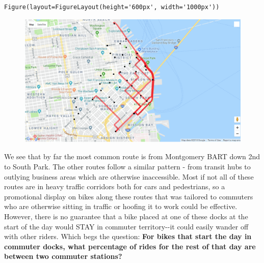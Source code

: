 \documentclass[11pt]{article}
\makeatletter
\def\maxwidth{\ifdim\Gin@nat@width>\linewidth\linewidth
    \else\Gin@nat@width\fi}
\let\Oldincludegraphics\includegraphics
\renewcommand{\includegraphics}[1]{\Oldincludegraphics[width=.8\maxwidth]{#1}}
\makeatother
\begin{document}
    
    \begin{verbatim}
Figure(layout=FigureLayout(height='600px', width='1000px'))
    \end{verbatim}

    
    \begin{figure}[htbp]
\centering
\includegraphics{imgs/commute_routes.PNG?raw=true}
\caption{}
\end{figure}

    We see that by far the most common route is from Montgomery BART down
2nd to South Park. The other routes follow a similar pattern - from
transit hubs to outlying business areas which are otherwise
inaccessible. Most if not all of these routes are in heavy traffic
corridors both for cars and pedestrians, so a promotional display on
bikes along these routes that was tailored to commuters who are
otherwise sitting in traffic or hoofing it to work could be effective.
However, there is no guarantee that a bike placed at one of these docks
at the start of the day would STAY in commuter territory-\/-it could
easily wander off with other riders. Which begs the question:
\textbf{For bikes that start the day in commuter docks, what percentage
of rides for the rest of that day are between two commuter stations?}
\end{document}
